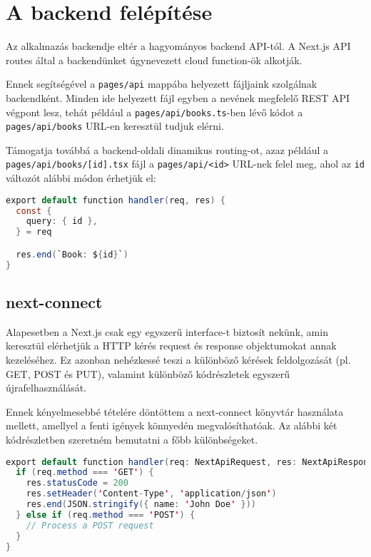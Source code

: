\section{A backend felépítése}

Az alkalmazás backendje eltér a hagyományos backend API-tól. A Next.js API routes által a backendünket úgynevezett cloud function-ök alkotják.

Ennek segítségével a \lstinline|pages/api| mappába helyezett fájljaink szolgálnak backendként. Minden ide helyezett fájl
egyben a nevének megfelelő REST API végpont lesz, tehát például a \lstinline|pages/api/books.ts|-ben lévő kódot a \lstinline|pages/api/books| URL-en keresztül tudjuk elérni.

Támogatja továbbá a backend-oldali dinamikus routing-ot, azaz például a \lstinline|pages/api/books/[id].tsx| fájl a \lstinline|pages/api/<id>| URL-nek felel meg, ahol
az \lstinline|id| változót alábbi módon érhetjük el:

\begin{lstlisting}[language=Java, caption=Next.js dinamikus routing]
export default function handler(req, res) {
  const {
    query: { id },
  } = req

  res.end(`Book: ${id}`)
}
\end{lstlisting}

\subsection{next-connect}
Alapesetben a Next.js csak egy egyszerű interface-t biztosít nekünk, amin keresztül elérhetjük a HTTP kérés request és response objektumokat annak kezeléséhez.
Ez azonban nehézkessé teszi a különböző kérések feldolgozását (pl. GET, POST és PUT), valamint különböző kódrészletek egyszerű újrafelhasználását.

Ennek kényelmesebbé tételére döntöttem a next-connect könyvtár használata mellett, amellyel a fenti igények könnyedén megvalósíthatóak.
Az alábbi két kódrészletben szeretném bemutatni a főbb különbségeket.

\begin{lstlisting}[language=Java, caption=Default Next.js API routes]
export default function handler(req: NextApiRequest, res: NextApiResponse) {
  if (req.method === 'GET') {
    res.statusCode = 200
    res.setHeader('Content-Type', 'application/json')
    res.end(JSON.stringify({ name: 'John Doe' }))
  } else if (req.method === 'POST') {
    // Process a POST request
  }
}
\end{lstlisting}

